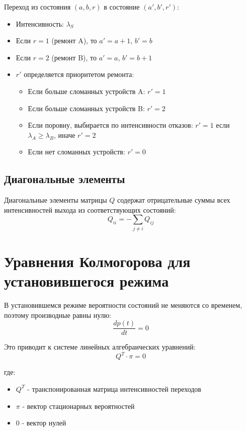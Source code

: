 \documentclass[12pt,a4paper]{article}
\begin{document}
Переход из состояния $(a, b, r)$ в состояние $(a', b', r')$:
\begin{itemize}
    \item Интенсивность: $\lambda_S$
    \item Если $r = 1$ (ремонт A), то $a' = a+1$, $b' = b$
    \item Если $r = 2$ (ремонт B), то $a' = a$, $b' = b+1$
    \item $r'$ определяется приоритетом ремонта:
    \begin{itemize}
        \item Если больше сломанных устройств A: $r' = 1$
        \item Если больше сломанных устройств B: $r' = 2$
        \item Если поровну, выбирается по интенсивности отказов: $r' = 1$ если $\lambda_A \geq \lambda_B$, иначе $r' = 2$
        \item Если нет сломанных устройств: $r' = 0$
    \end{itemize}
\end{itemize}

\subsection{Диагональные элементы}

Диагональные элементы матрицы $Q$ содержат отрицательные суммы всех интенсивностей выхода из соответствующих состояний:
\begin{equation}
    Q_{ii} = -\sum_{j \neq i} Q_{ij}
\end{equation}

\section{Уравнения Колмогорова для установившегося режима}

В установившемся режиме вероятности состояний не меняются со временем, поэтому производные равны нулю:
\begin{equation}
    \frac{dp(t)}{dt} = 0
\end{equation}

Это приводит к системе линейных алгебраических уравнений:
\begin{equation}
    Q^T \cdot \pi = 0
\end{equation}

где:
\begin{itemize}
    \item $Q^T$ - транспонированная матрица интенсивностей переходов
    \item $\pi$ - вектор стационарных вероятностей
    \item $0$ - вектор нулей
\end{itemize}
\end{document}
